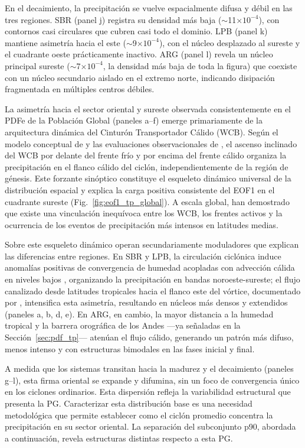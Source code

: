 En el decaimiento, la precipitación se vuelve espacialmente difusa y débil en las tres regiones. SBR (panel j) registra su densidad más baja ($\sim$11$\times10^{-4}$), con contornos casi circulares que cubren casi todo el dominio. LPB (panel k) mantiene asimetría hacia el este ($\sim$9$\times10^{-4}$), con el núcleo desplazado al sureste y el cuadrante oeste prácticamente inactivo. ARG (panel l) revela un núcleo principal sureste ($\sim$7$\times10^{-4}$, la densidad más baja de toda la figura) que coexiste con un núcleo secundario aislado en el extremo norte, indicando disipación fragmentada en múltiples centros débiles.

La asimetría hacia el sector oriental y sureste observada consistentemente en el PDFe de la Población Global (paneles a--f) emerge primariamente de la arquitectura dinámica del Cinturón Transportador Cálido (WCB). Según el modelo conceptual de \citet{browning1986conceptual} y las evaluaciones observacionales de \citet{naud2020evaluation}, el ascenso inclinado del WCB por delante del frente frío y por encima del frente cálido organiza la precipitación en el flanco cálido del ciclón, independientemente de la región de génesis. Este forzante sinóptico constituye el esqueleto dinámico universal de la distribución espacial y explica la carga positiva consistente del EOF1 en el cuadrante sureste (Fig.~\ref{fig:eof1_tp_global}). 
A escala global, \citet{catto2015fronts} han demostrado que existe una vinculación inequívoca entre los WCB, los frentes activos y la ocurrencia de los eventos de precipitación más intensos en latitudes medias.

Sobre este esqueleto dinámico operan secundariamente moduladores que explican las diferencias entre regiones. En SBR y LPB, la circulación ciclónica induce anomalías positivas de convergencia de humedad acopladas con advección cálida en niveles bajos \citep{cardoso2022synoptic}, organizando la precipitación en bandas noroeste-sureste; el flujo canalizado desde latitudes tropicales hacia el flanco este del vórtice, documentado por \citet{vera2002cold}, intensifica esta asimetría, resultando en núcleos más densos y extendidos (paneles a, b, d, e). 
En ARG, en cambio, la mayor distancia a la humedad tropical y la barrera orográfica de los Andes —ya señaladas en la Sección~\ref{sec:pdf_tp}— atenúan el flujo cálido, generando un patrón más difuso, menos intenso y con estructuras bimodales en las fases inicial y final.

A medida que los sistemas transitan hacia la madurez y el decaimiento (paneles g--l), esta firma oriental se expande y difumina, sin un foco de convergencia único en los ciclones ordinarios.
Esta dispersión refleja la variabilidad estructural que presenta la PG. 
Caracterizar esta distribución base es una necesidad metodológica que permite establecer como el ciclón promedio concentra la  precipitación en su sector oriental. 
La separación del subconjunto p90, abordada a continuación, revela estructuras distintas respecto a esta PG.

